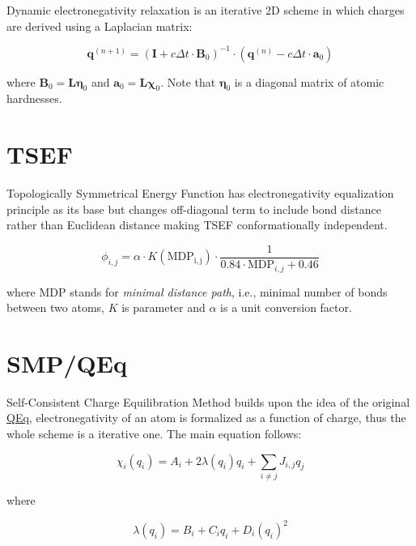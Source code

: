\documentclass[oneside]{memoir}
\newcommand\ddfrac[2]{\frac{\displaystyle #1}{\displaystyle #2}}
\begin{document}
Dynamic electronegativity relaxation \cite{Shulga2008} is an iterative 2D scheme in which charges are derived using a Laplacian matrix:

\begin{equation}
\label{eq:denr_main}
\bm{q}^{(n + 1)} = (\bm{I} + c\Delta t\cdot \bm{B}_0)^{-1}\cdot(\bm{q}^{(n)} - c\Delta t\cdot \bm{a}_0)
\end{equation}

where $\bm{B}_0 = \bm{L}\bm{\eta}_0$ and $\bm{a}_0 = \bm{L}\bm{\chi}_0$. Note that $\bm{\eta}_0$ is a diagonal matrix of atomic hardnesses.

\section*{TSEF}
\label{sec:methods_tsef}

Topologically Symmetrical Energy Function \cite{Shulga2008} has electronegativity equalization principle as its base but changes off-diagonal term to include bond distance rather than Euclidean distance making TSEF conformationally independent.

\begin{equation}
\label{eq:tsef_main}
\phi_{i, j} = \alpha \cdot K\mathrm{(MDP_{i, j})}\cdot\ddfrac{1}{0.84\cdot\mathrm{MDP}_{i, j} + 0.46}
\end{equation}

where $\mathrm{MDP}$ stands for \textit{minimal distance path}, i.e., minimal number of bonds between two atoms, $K$ is parameter and $\alpha$ is a unit conversion factor.

\section*{SMP/QEq}
\label{sec:methods_smpqeq}

Self-Consistent Charge Equilibration Method \cite{Zhang2009} builds upon the idea of the original \hyperref[sec:methods_qeq]{QEq}, electronegativity of an atom is formalized as a function of charge, thus the whole scheme is a iterative one. The main equation follows:

\begin{equation}
\label{eq:smpqeq_main}
\chi_i(q_i) = A_i + 2\lambda(q_i)q_i + \sum_{i\neq j} J_{i, j}q_j
\end{equation}

where

\begin{equation}
\label{eq:smpqeq_lambda}
\lambda(q_i) = B_i + C_iq_i + D_i(q_i)^2
\end{equation}
\end{document}
